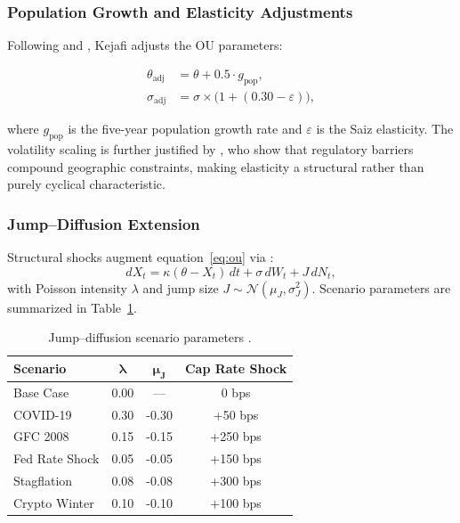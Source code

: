 \documentclass[11pt,letterpaper]{article}
\begin{document}
\subsubsection{Population Growth and Elasticity Adjustments}

Following \citet{glaeser2018} and \citet{saiz2010}, Kejafi adjusts the OU parameters:
\begin{eqbox}
\begin{align}
\theta_{\text{adj}} &= \theta + 0.5 \cdot g_{\text{pop}}, \label{eq:theta}\\
\sigma_{\text{adj}} &= \sigma \times \bigl(1 + (0.30 - \varepsilon)\bigr), \label{eq:sigma}
\end{align}
\end{eqbox}
where $g_{\text{pop}}$ is the five-year population growth rate and $\varepsilon$ is the
Saiz elasticity. The volatility scaling is further justified by \citet{gyourko2015}, who
show that regulatory barriers compound geographic constraints, making elasticity a
structural rather than purely cyclical characteristic.

\subsubsection{Jump--Diffusion Extension}

Structural shocks augment equation~\eqref{eq:ou} via \citet{merton1976}:
\begin{equation}
dX_t = \kappa(\theta - X_t)\,dt + \sigma\,dW_t + J\,dN_t,
\label{eq:jd}
\end{equation}
with Poisson intensity $\lambda$ and jump size $J \sim \mathcal{N}(\mu_J,\sigma_J^2)$.
Scenario parameters are summarized in Table~\ref{tab:jump_params}.

\begin{table}[H]
\centering
\caption{Jump--diffusion scenario parameters \citep{merton1976}.}
\label{tab:jump_params}
\begin{tabular}{lccc}
\toprule
\textbf{Scenario} & $\bm{\lambda}$ & $\bm{\mu_J}$ & \textbf{Cap Rate Shock} \\
\midrule
Base Case      & 0.00 & ---    & 0 bps   \\
COVID-19       & 0.30 & -0.30  & +50 bps \\
GFC 2008       & 0.15 & -0.15  & +250 bps\\
Fed Rate Shock & 0.05 & -0.05  & +150 bps\\
Stagflation    & 0.08 & -0.08  & +300 bps\\
Crypto Winter  & 0.10 & -0.10  & +100 bps\\
\bottomrule
\end{tabular}
\end{table}
\end{document}
